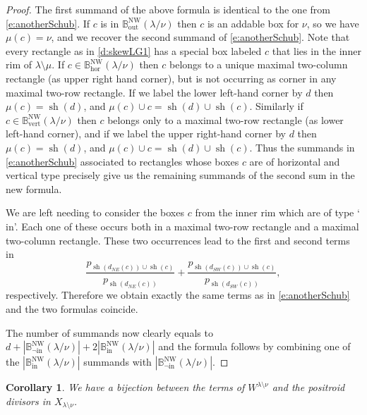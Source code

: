 \documentclass{amsart}
\newtheorem{cor}[thm]{Corollary}
\theoremstyle{definition}
\numberwithin{equation}{section}
\def\sh{\operatorname{sh}}
\def\NW{\operatorname{NW}}
\def\out{\operatorname{out}}
\newcommand{\BB}{{\mathbb B}}
\begin{document}
\begin{proof}
The first summand of the above formula is identical to the one from \eqref{e:anotherSchub}. If $c$ is in $\BB^{\NW}_{\out}(\lambda/\nu)$ then $c$ is an addable box for $\nu$, so we have $\mu(c)=\nu$, and we recover the second summand of  \eqref{e:anotherSchub}. Note that every rectangle as in \cref{d:skewLG1} has a special box labeled $c$ that lies in the inner rim of $\lambda\setminus\mu$. If $c\in \BB^{\NW}_{\mathrm{hor}}(\lambda/\nu)$ then $c$ belongs to a unique maximal two-column rectangle (as upper right hand corner), but is not occurring as corner in any maximal two-row rectangle. If we label the lower left-hand corner by $d$ then $\mu(c)=\sh(d)$, and $\mu(c)\cup c=\sh(d)\cup\sh(c)$. Similarly if $c\in \BB^{\NW}_{\mathrm{vert}}(\lambda/\nu)$ then $c$ belongs only to a maximal two-row rectangle (as lower left-hand corner), and if we label the upper right-hand corner by $d$ then $\mu(c)=\sh(d)$, and $\mu(c)\cup c=\sh(d)\cup\sh(c)$. Thus the summands in \eqref{e:anotherSchub} associated to  rectangles whose boxes $c$ are of horizontal and vertical type precisely give us the remaining summands of the second sum in the new formula. 

We are left needing to consider the boxes $c$ from the inner rim which are of type `$\mathrm {in}$'. Each one of these occurs both in a maximal two-row rectangle 
and a maximal two-column rectangle. These two occurrences lead to the first and second terms in 
\[
\frac{p_{\sh(d_{NE}(c))\cup \sh(c)}}{p_{\sh(d_{NE}(c))}}+\frac{p_{\sh(d_{SW}(c))\cup \sh(c)}}{p_{\sh(d_{SW}(c))}},
\]
respectively. Therefore we obtain exactly the same terms as in \eqref{e:anotherSchub} and the two formulas coincide.

The number of summands now clearly equals to 
$ d+ |\BB^{\NW}_{\neg \mathrm{in}}(\lambda/\nu)| + 2|\BB^{\NW}_{\mathrm{in}}(\lambda/\nu)|$ and the formula follows by combining one of the $|\BB^{\NW}_{\mathrm{in}}(\lambda/\nu)|$ summands with $ |\BB^{\NW}_{\neg \mathrm{in}}(\lambda/\nu)| $.
 \end{proof}
 
 \begin{cor} We have a bijection between the terms of $W^{\lambda\setminus\nu}$ and the positroid divisors 
	 in $X_{\lambda\setminus\nu}$. 
 \end{cor}
\end{document}
